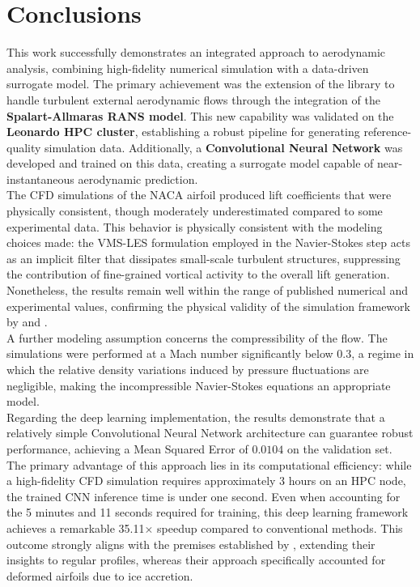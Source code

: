 \section{Conclusions}
\label{sec:05_Conclusions}

This work successfully demonstrates an integrated approach to aerodynamic analysis, combining high-fidelity numerical simulation with a data-driven surrogate model. The primary achievement was the extension of the \textbf{\lifex} library to handle turbulent external aerodynamic flows through the integration of the \textbf{Spalart-Allmaras RANS model}. This new capability was validated on the \textbf{Leonardo HPC cluster}, establishing a robust pipeline for generating reference-quality simulation data. Additionally, a \textbf{Convolutional Neural Network} was developed and trained on this data, creating a surrogate model capable of near-instantaneous aerodynamic prediction.\\

The CFD simulations of the NACA airfoil produced lift coefficients that were physically consistent, though moderately underestimated compared to some experimental data. This behavior is physically consistent with the modeling choices made: the VMS-LES formulation employed in the Navier-Stokes step acts as an implicit filter that dissipates small-scale turbulent structures, suppressing the contribution of fine-grained vortical activity to the overall lift generation. Nonetheless, the results remain well within the range of published numerical and experimental values, confirming the physical validity of the simulation framework by \cite{ladson1988} and \cite{mccroskey1988}.\\

A further modeling assumption concerns the compressibility of the flow. The simulations were performed at a Mach number significantly below $0.3$, a regime in which the relative density variations induced by pressure fluctuations are negligible, making the incompressible Navier-Stokes equations an appropriate model.\\

Regarding the deep learning implementation, the results demonstrate that a relatively simple Convolutional Neural Network architecture can guarantee robust performance, achieving a Mean Squared Error of $0.0104$ on the validation set. The primary advantage of this approach lies in its computational efficiency: while a high-fidelity CFD simulation requires approximately 3 hours on an HPC node, the trained CNN inference time is under one second. Even when accounting for the 5 minutes and 11 seconds required for training, this deep learning framework achieves a remarkable 35.11$\times$ speedup compared to conventional methods. This outcome strongly aligns with the premises established by \cite{Cuozzo2026AIDriven}, extending their insights to regular profiles, whereas their approach specifically accounted for deformed airfoils due to ice accretion.\\


